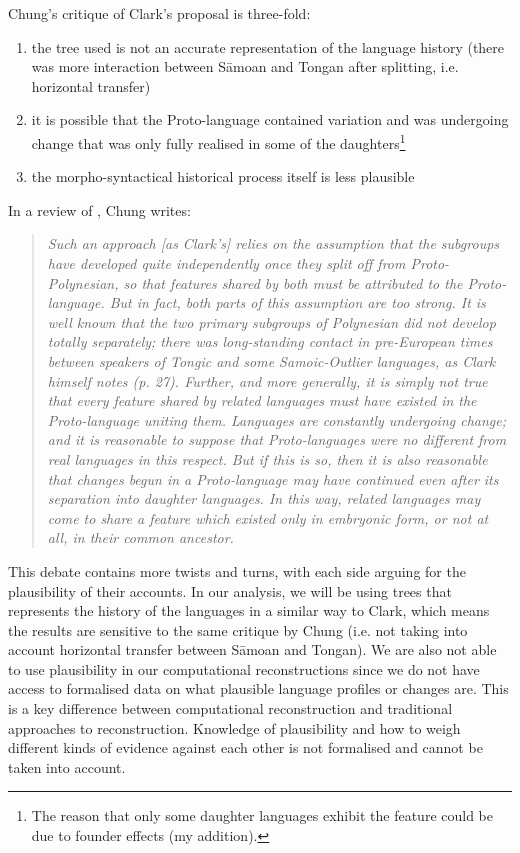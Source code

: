 \documentclass[a4paper,10pt]{article} %
\begin{document}
Chung's critique of Clark's proposal is three-fold: 
\begin{enumerate}[label=(\alph*)]
\item the tree used is not an accurate representation of the language history (there was more interaction between S\={a}moan and Tongan after splitting, i.e. horizontal transfer)
\item it is possible that the Proto-language contained variation and was undergoing change that was only fully realised in some of the daughters\footnote{The reason that only some daughter languages exhibit the feature could be due to founder effects (my addition).} 
\item the morpho-syntactical historical process itself is less plausible
\end{enumerate}

In a review of \citet{clark1976aspects}, Chung writes:

\begin{quotation}
\noindent\emph{Such an approach [as Clark's] relies on the assumption that the subgroups have developed quite independently once they split off from Proto-Polynesian, so that features shared by both must be attributed to the Proto-language. But in fact, both parts of this assumption are too strong. It is well known that the two primary subgroups of Polynesian did not develop totally separately; there was long-standing contact in pre-European times between speakers of Tongic and some Samoic-Outlier languages, as Clark himself notes (p. 27). Further, and more generally, it is simply not true that every feature shared by related languages must have existed in the Proto-language uniting them. Languages are constantly undergoing change; and it is reasonable to suppose that Proto-languages were no different from real languages in this respect. But if this is so, then it is also reasonable that changes begun in a Proto-language may have continued even after its separation into daughter languages. In this way, related languages may come to share a feature which existed only in embryonic form, or not at all, in their common ancestor.}
\end{quotation}
\begin{flushright} \citet[539]{chung1977aspects}  \end{flushright}

This debate contains more twists and turns, with each side arguing for the plausibility of their accounts. In our analysis, we will be using trees that represents the history of the languages in a similar way to Clark, which means the results are sensitive to the same critique by Chung (i.e. not taking into account horizontal transfer between S\={a}moan and Tongan). We are also not able to use plausibility in our computational reconstructions since we do not have access to formalised data on what plausible language profiles or changes are. This is a key difference between computational reconstruction and traditional approaches to reconstruction. Knowledge of plausibility and how to weigh different kinds of evidence against each other is not formalised and cannot be taken into account.
\end{document}
